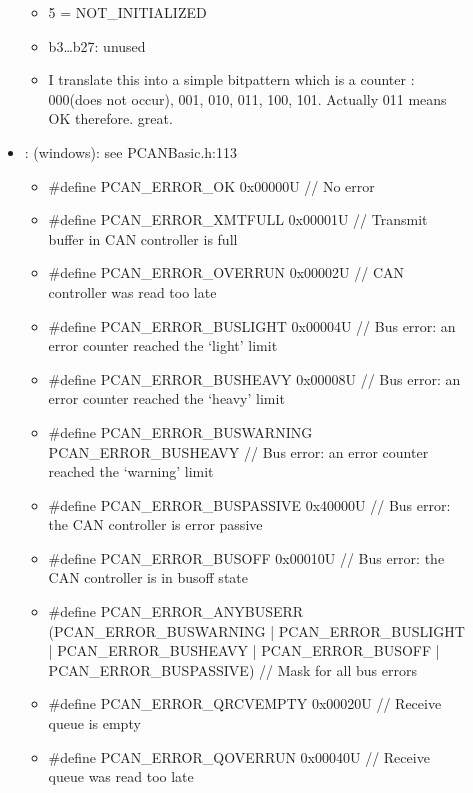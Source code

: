 \documentclass[a4paper,10pt,english]{sphinxmanual}
\begin{document}
\begin{fulllineitems}
\begin{fulllineitems}
\begin{description}
\begin{itemize}
\begin{itemize}
\item {} 
5 = NOT\_INITIALIZED

\item {} 
b3…b27: unused

\item {} 
I translate this into a simple bitpattern which is a counter : 000(does not occur), 001, 010, 011, 100, 101. Actually 011 means OK therefore. great.

\end{itemize}


\item {} 
: (windows): see PCANBasic.h:113\begin{itemize}
\item {} 
\#define PCAN\_ERROR\_OK 0x00000U // No error

\item {} 
\#define PCAN\_ERROR\_XMTFULL 0x00001U // Transmit buffer in CAN controller is full

\item {} 
\#define PCAN\_ERROR\_OVERRUN 0x00002U // CAN controller was read too late

\item {} 
\#define PCAN\_ERROR\_BUSLIGHT 0x00004U // Bus error: an error counter reached the ‘light’ limit

\item {} 
\#define PCAN\_ERROR\_BUSHEAVY 0x00008U // Bus error: an error counter reached the ‘heavy’ limit

\item {} 
\#define PCAN\_ERROR\_BUSWARNING PCAN\_ERROR\_BUSHEAVY // Bus error: an error counter reached the ‘warning’ limit

\item {} 
\#define PCAN\_ERROR\_BUSPASSIVE 0x40000U // Bus error: the CAN controller is error passive

\item {} 
\#define PCAN\_ERROR\_BUSOFF 0x00010U // Bus error: the CAN controller is in bus\sphinxhyphen{}off state

\item {} 
\#define PCAN\_ERROR\_ANYBUSERR (PCAN\_ERROR\_BUSWARNING | PCAN\_ERROR\_BUSLIGHT | PCAN\_ERROR\_BUSHEAVY | PCAN\_ERROR\_BUSOFF | PCAN\_ERROR\_BUSPASSIVE) // Mask for all bus errors

\item {} 
\#define PCAN\_ERROR\_QRCVEMPTY 0x00020U // Receive queue is empty

\item {} 
\#define PCAN\_ERROR\_QOVERRUN 0x00040U // Receive queue was read too late


\end{itemize}
\end{itemize}
\end{description}
\end{fulllineitems}
\end{fulllineitems}
\end{document}
